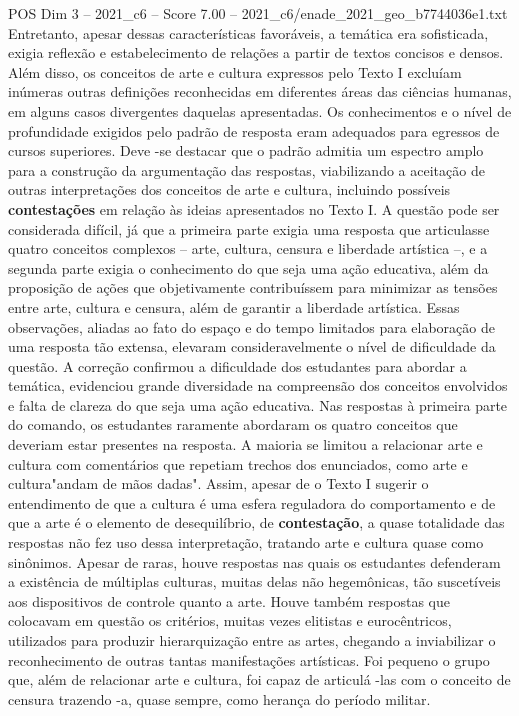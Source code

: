 \begin{textsample}{POS Dim 3 – 2021\_c6 – Score 7.00 – 2021\_c6/enade\_2021\_geo\_b7744036e1.txt}
Entretanto, apesar dessas características favoráveis, a temática era sofisticada, exigia reflexão e estabelecimento de relações a partir de textos concisos e densos.
Além disso, os conceitos de arte e cultura expressos pelo Texto I excluíam inúmeras outras definições reconhecidas em diferentes áreas das ciências humanas, em alguns casos divergentes daquelas apresentadas.
Os conhecimentos e o nível de profundidade exigidos pelo padrão de resposta eram adequados para egressos de cursos superiores.
Deve -se destacar que o padrão admitia um espectro amplo para a construção da argumentação das respostas, viabilizando a aceitação de outras interpretações dos conceitos de arte e cultura, incluindo possíveis \textbf{contestações} em relação às ideias apresentados no Texto I.
A questão pode ser considerada difícil, já que a primeira parte exigia uma resposta que articulasse quatro conceitos complexos – arte, cultura, censura e liberdade artística –, e a segunda parte exigia o conhecimento do que seja uma ação educativa, além da proposição de ações que objetivamente contribuíssem para minimizar as tensões entre arte, cultura e censura, além de garantir a liberdade artística.
Essas observações, aliadas ao fato do espaço e do tempo limitados para elaboração de uma resposta tão extensa, elevaram consideravelmente o nível de dificuldade da questão.
A correção confirmou a dificuldade dos estudantes para abordar a temática, evidenciou grande diversidade na compreensão dos conceitos envolvidos e falta de clareza do que seja uma ação educativa.
Nas respostas à primeira parte do comando, os estudantes raramente abordaram os quatro conceitos que deveriam estar presentes na resposta.
A maioria se limitou a relacionar arte e cultura com comentários que repetiam trechos dos enunciados, como arte e cultura"andam de mãos dadas".
Assim, apesar de o Texto I sugerir o entendimento de que a cultura é uma esfera reguladora do comportamento e de que a arte é o elemento de desequilíbrio, de \textbf{contestação}, a quase totalidade das respostas não fez uso dessa interpretação, tratando arte e cultura quase como sinônimos.
Apesar de raras, houve respostas nas quais os estudantes defenderam a existência de múltiplas culturas, muitas delas não hegemônicas, tão suscetíveis aos dispositivos de controle quanto a arte.
Houve também respostas que colocavam em questão os critérios, muitas vezes elitistas e eurocêntricos, utilizados para produzir hierarquização entre as artes, chegando a inviabilizar o reconhecimento de outras tantas manifestações artísticas.
Foi pequeno o grupo que, além de relacionar arte e cultura, foi capaz de articulá -las com o conceito de censura trazendo -a, quase sempre, como herança do período militar.

\end{textsample}
